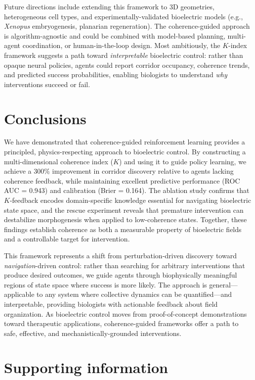 \documentclass[10pt,letterpaper]{article}
\begin{document}
Future directions include extending this framework to 3D geometries, heterogeneous cell types, and experimentally-validated bioelectric models (e.g., \emph{Xenopus} embryogenesis, planarian regeneration). The coherence-guided approach is algorithm-agnostic and could be combined with model-based planning, multi-agent coordination, or human-in-the-loop design. Most ambitiously, the $K$-index framework suggests a path toward \emph{interpretable} bioelectric control: rather than opaque neural policies, agents could report corridor occupancy, coherence trends, and predicted success probabilities, enabling biologists to understand \emph{why} interventions succeed or fail.

\section*{Conclusions}

We have demonstrated that coherence-guided reinforcement learning provides a principled, physics-respecting approach to bioelectric control. By constructing a multi-dimensional coherence index ($K$) and using it to guide policy learning, we achieve a 300\% improvement in corridor discovery relative to agents lacking coherence feedback, while maintaining excellent predictive performance (ROC AUC = 0.943) and calibration (Brier = 0.164). The ablation study confirms that $K$-feedback encodes domain-specific knowledge essential for navigating bioelectric state space, and the rescue experiment reveals that premature intervention can destabilize morphogenesis when applied to low-coherence states. Together, these findings establish coherence as both a measurable property of bioelectric fields and a controllable target for intervention.

This framework represents a shift from perturbation-driven discovery toward \emph{navigation}-driven control: rather than searching for arbitrary interventions that produce desired outcomes, we guide agents through biophysically meaningful regions of state space where success is more likely. The approach is general—applicable to any system where collective dynamics can be quantified—and interpretable, providing biologists with actionable feedback about field organization. As bioelectric control moves from proof-of-concept demonstrations toward therapeutic applications, coherence-guided frameworks offer a path to safe, effective, and mechanistically-grounded interventions.

\section*{Supporting information}
\end{document}
